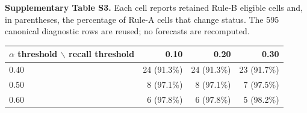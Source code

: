 \begin{table}[ht]
\centering
\textbf{Supplementary Table S3.} Each cell reports retained Rule-B eligible cells and, in parentheses, the percentage of Rule-A cells that change status. The 595 canonical diagnostic rows are reused; no forecasts are recomputed.\par\smallskip
\begin{tabular}{lrrr}
\toprule
$\alpha$ threshold $\backslash$ recall threshold & 0.10 & 0.20 & 0.30 \\
\midrule
0.40 & 24 (91.3\%) & 24 (91.3\%) & 23 (91.7\%) \\
0.50 & 8 (97.1\%) & 8 (97.1\%) & 7 (97.5\%) \\
0.60 & 6 (97.8\%) & 6 (97.8\%) & 5 (98.2\%) \\
\bottomrule
\end{tabular}
\end{table}
